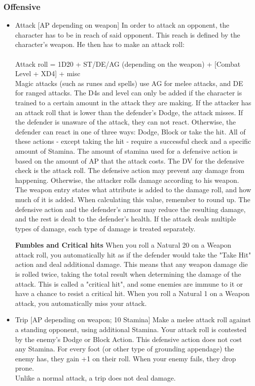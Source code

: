\subsubsection{Offensive}\label{subsubsec:offensiveStaticCombatActions}
\begin{itemize}
\item Attack [AP depending on weapon]
In order to attack an opponent, the character has to be in reach of said opponent.
This reach is defined by the character's weapon.
He then has to make an attack roll:\\
\\
Attack roll = 1D20 + ST/DE/AG (depending on the weapon) + [Combat Level + XD4] + misc
\\
Magic attacks (such as runes and spells) use AG for melee attacks, and DE for ranged attacks.
The D4s and level can only be added if the character is trained to a certain amount in the attack they are making.
If the attacker has an attack roll that is lower than the defender's Dodge, the attack misses.
If the defender is unaware of the attack, they can not react.
Otherwise, the defender can react in one of three ways: Dodge, Block or take the hit.
All of these actions - except taking the hit - require a successful check and a specific amount of Stamina.
The amount of stamina used for a defensive action is based on the amount of  AP that the attack costs.
The DV for the defensive check is the attack roll.
The defensive action may prevent any damage from happening.
Otherwise, the attacker rolls damage according to his weapon.
The weapon entry states what attribute is added to the damage roll, and how much of it is added.
When calculating this value, remember to round up.
The defensive action and the defender's armor may reduce the resulting damage, and the rest is dealt to the defender's health.
If the attack deals multiple types of damage, each type of damage is treated separately.


\textbf{Fumbles and Critical hits}
When you roll a Natural 20 on a Weapon attack roll, you automatically hit as if the defender would take the "Take Hit" action and deal additional damage.
This means that any weapon damage die is rolled twice, taking the total result when determining the damage of the attack.
This is called a "critical hit", and some enemies are immune to it or have a chance to resist a critical hit.
When you roll a Natural 1 on a Weapon attack, you automatically miss your attack.


\item Trip [AP depending on weapon; 10 Stamina]
Make a melee attack roll against a standing opponent, using additional Stamina.
Your attack roll is contested by the enemy's Dodge or Block Action.
This defensive action does not cost any Stamina.
For every foot (or other type of grounding appendage) the enemy has, they gain +1 on their roll.
When your enemy fails, they drop prone.\\
Unlike a normal attack, a trip does not deal damage.\\



\end{itemize}
